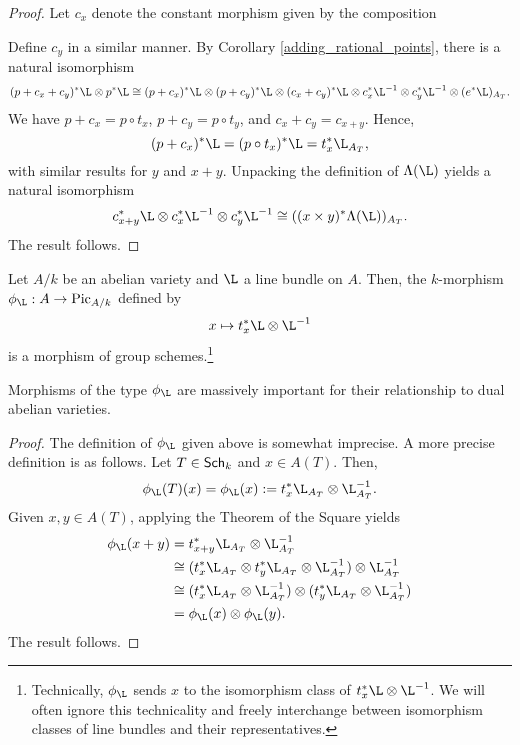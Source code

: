 \documentclass[11pt]{article}
\begin{document}
\begin{proof}
Let $c_x$ denote the constant morphism given by the composition
\begin{center}
\end{center}
Define $c_y$ in a similar manner. By Corollary \ref{adding_rational_points}, there is a natural isomorphism
\begin{align*}
(p+c_x+c_y)^*\L\tensor p^*\L
\iso(p+c_x)^*\L\tensor(p+c_y)^*\L\tensor(c_x+c_y)^*\L\tensor c_x^*\L^{-1}\tensor c_y^*\L^{-1}\tensor(e^*\L)_{A_T}.
\end{align*}
We have $p+c_x=p\circ t_x$, $p+c_y=p\circ t_y$, and $c_x+c_y=c_{x+y}$. Hence, 
$$(p+c_x)^*\L=(p\circ t_x)^*\L=t_x^*\L_{A_T},$$
with similar results for $y$ and $x+y$. Unpacking the definition of $\Lambda(\L)$ yields a natural isomorphism
$$c_{x+y}^*\L\tensor c_x^*\L^{-1}\tensor c_y^*\L^{-1}\iso((x\times y)^*\Lambda(\L))_{A_T}.$$
The result follows.
\end{proof}

\begin{corollary}\label{homomorphism}
Let $A/k$ be an abelian variety and $\L$ a line bundle on $A$. Then, the $k$-morphism $\phi_{\L}: A\to\Pic_{A/k}$ defined by 
$$x\mapsto t_x^*\L\tensor\L^{-1}$$
is a morphism of group schemes.\footnote{Technically, $\phi_{\L}$ sends $x$ to the isomorphism class of $t_x^*\L\tensor\L^{-1}$. We will often ignore this technicality and freely interchange between isomorphism classes of line bundles and their representatives.}
\end{corollary}

Morphisms of the type $\phi_{\L}$ are massively important for their relationship to dual abelian varieties.

\begin{proof}
The definition of $\phi_{\L}$ given above is somewhat imprecise. A more precise definition is as follows. Let $T\in\operatorname{\mathsf{Sch}}_k$ and $x\in A(T)$. Then,
$$\phi_{\L}(T)(x)=\phi_{\L}(x):=t_x^*\L_{A_T}\tensor\L_{A_T}^{-1}.$$
Given $x,y\in A(T)$, applying the Theorem of the Square yields
\begin{align*}
\phi_{\L}(x+y)
&=t_{x+y}^*\L_{A_T}\tensor\L_{A_T}^{-1} \\
&\iso(t_x^*\L_{A_T}\tensor t_y^*\L_{A_T}\tensor\L_{A_T}^{-1})\tensor\L_{A_T}^{-1} \\
&\iso(t_x^*\L_{A_T}\tensor\L_{A_T}^{-1})\tensor(t_y^*\L_{A_T}\tensor\L_{A_T}^{-1}) \\
&=\phi_{\L}(x)\tensor\phi_{\L}(y).
\end{align*}
The result follows.
\end{proof}
\end{document}
